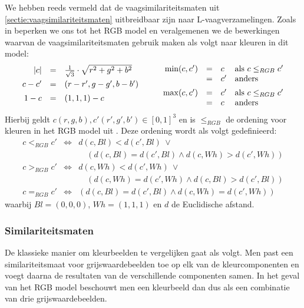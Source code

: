 We hebben reeds vermeld dat de vaagsimilariteitsmaten uit \ref{sectie:vaagsimilariteitsmaten}
uitbreidbaar zijn naar L-vaag\-ver\-za\-me\-ling\-en. Zoals in 
\cite{anoniem:similariteitsmaten_voor_kleurbeelden} beperken we ons tot het 
RGB model en veralgemenen we de be\-wer\-king\-en waarvan de vaagsimilariteitsmaten gebruik maken 
als volgt naar kleuren in dit model:
$$
\begin{array}{r@{\qquad}l}
\begin{array}{rcl}
|c| & = & \frac{1}{\sqrt{3}} \cdot \sqrt{r^2 + g^2 + b^2} \\[5pt]
c - c' & = & (r-r',g-g',b-b') \\[5pt]
1 - c & = & (1,1,1) - c \\[5pt]
\end{array}
&
\begin{array}{rcll}
\min (c,c') & = & c & \textrm{als } c \leq_{RGB} c' \\
		  & = & c' & \textrm{anders} \\[5pt]
\max (c,c') & = & c' & \textrm{als } c \leq_{RGB} c' \\
		  & = & c & \textrm{anders}
\end{array}
\end{array}
$$
Hierbij geldt $c(r,g,b), c'(r',g',b') \in [0,1]^3$ en is $\leq_{RGB}$ de ordening voor
kleuren in het RGB model uit \cite{dewitte:vect_morph_ops}. Deze ordening wordt als volgt gedefinieerd:
$$
\begin{array}{rcl}
c <_{RGB} c' & \iff & d(c,Bl) < d(c',Bl)\ \lor \\
			   &	  & \quad(d(c,Bl) = d(c',Bl) \land d(c,Wh) > d(c',Wh)) \\[5pt]
c >_{RGB} c' & \iff & d(c,Wh) < d(c',Wh)\ \lor \\
			   &	  & \quad(d(c,Wh) = d(c',Wh) \land d(c,Bl) > d(c',Bl)) \\[5pt]
c =_{RGB} c'   & \iff & (d(c,Bl) = d(c',Bl) \land d(c,Wh) = d(c',Wh))
\end{array}
$$
waarbij $Bl=(0,0,0)$, $Wh=(1,1,1)$ en $d$ de Euclidische afstand.

\subsubsection{Similariteitsmaten}

De klassieke manier om kleurbeelden te vergelijken gaat als volgt. Men past een similariteitsmaat 
voor grijswaardebeelden toe op elk van de kleurcomponenten en voegt daarna de resultaten van de
verschillende componenten samen. In het geval van het RGB model beschouwt men een
kleurbeeld dan dus als een combinatie van drie grijswaardebeelden. 


